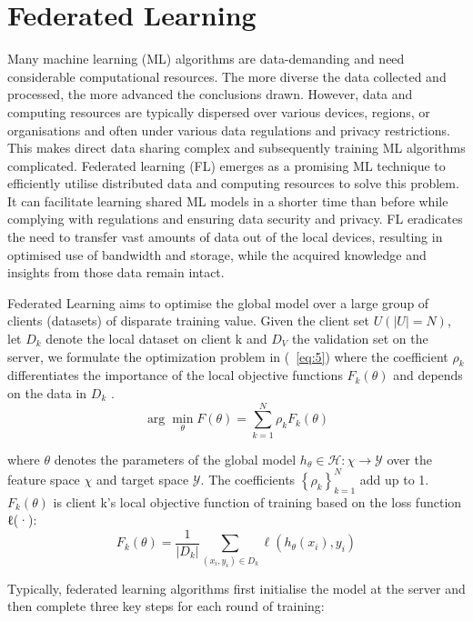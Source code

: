 \documentclass[withindex,glossary]{cam-thesis}
\begin{document}
\section{Federated Learning}
Many machine learning (ML) algorithms are data-demanding and need considerable computational resources. The more diverse the data collected and processed, the more advanced the conclusions drawn. However, data and computing resources are typically dispersed over various devices, regions, or organisations and often under various data regulations and privacy restrictions. This makes direct data sharing complex and subsequently training ML algorithms complicated. Federated learning (FL) emerges as a promising ML technique to efficiently utilise distributed data and computing resources to solve this problem. It can facilitate learning shared ML models in a shorter time than before while complying with regulations and ensuring data security and privacy. FL eradicates the need to transfer vast amounts of data out of the local devices, resulting in optimised use of bandwidth and storage, while the acquired knowledge and insights from those data remain intact.

Federated Learning aims to optimise the global model over a large group of clients (datasets) of disparate training value. Given the client set $U(|U| = N)$, let $D_k$ denote the local dataset on client k and $D_V$ the validation set on the server, we formulate the optimization problem in (~\ref{eq:5}) where the coefficient $ρ_k$ differentiates the importance of the local objective functions $F_k(\theta)$ and depends on the data in $D_k$ . 
\begin{equation}
\arg \min _{\theta} F(\theta)=\sum_{k=1}^{N} \rho_{k} F_{k}(\theta)
\label{eq:5}
\end{equation}

where $\theta$ denotes the parameters of the global model \(h_{\theta} \in \mathcal{H}: \chi \rightarrow \mathcal{Y}\) over the feature space \(\chi\) and target space \(\mathcal{Y}\). The coefficients \(\left\{\rho_{k}\right\}_{k=1}^{N}\) add up to 1. \(F_{k}(\theta)\) is client k’s local objective function of training based on the loss function ℓ(·):
\begin{equation}
F_{k}(\theta)=\frac{1}{\left|D_{k}\right|} \sum_{\left(x_{i}, y_{i}\right) \in D_{k}} \ell\left(h_{\theta}\left(x_{i}\right), y_{i}\right)
\end{equation}

Typically, federated learning algorithms first initialise the model at the server and then complete three key steps for each round of training:
\end{document}

